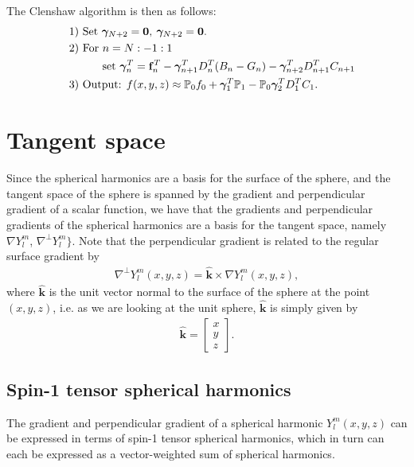 \documentclass[11pt, oneside]{article}   	%
\newcommand{\Ylm}{Y^m_l}
\newcommand{\bigP}{\mathbb{P}}
\newcommand{\gradYlm}{\nabla Y^m_l}
\newcommand{\gradpYlm}{\nabla^\perp Y^m_l}
\newcommand{\unitvec}{\hat{\bm{k}}}
\begin{document}
The Clenshaw algorithm is then as follows:
\begin{align*}
\quad &\text{1) } \text{Set } \bm{\gamma}_{N+2} = \bold{0}, \: \bm{\gamma}_{N+2} = \bold{0}. \\
\quad &\text{2) } \text{For } n = N:-1:1 \\
\quad & \quad \quad \quad \text{set } \bm{\gamma}_{n}^T = \bold{f}_n^T - \bm{\gamma}_{n+1}^T D^T_n (B_n - G_n) -  \bm{\gamma}_{n+2}^T D^T_{n+1}C_{n+1} \\
\quad &\text{3) } \text{Output: } f(x,y,z) \approx \bigP_0 f_0 + \bm{\gamma}_{1}^T \bigP_1 - \bigP_0 \bm{\gamma}_{2}^T D^T_1 C_1.
\end{align*}






\section{Tangent space}

Since the spherical harmonics are a basis for the surface of the sphere, and the tangent space of the sphere is spanned by the gradient  and perpendicular gradient of a scalar function, we have that the gradients and perpendicular gradients of the spherical harmonics are a basis for the tangent space, namely \(\gradYlm\), \(\gradpYlm\}\). Note that the perpendicular gradient is related to the regular surface gradient by
\begin{align}
\gradpYlm(x,y,z) = \unitvec \times \gradYlm(x,y,z),
\end{align}
where \(\unitvec\) is the unit vector normal to the surface of the sphere at the point \((x,y,z)\), i.e. as we are looking at the unit sphere, \(\unitvec\) is simply given by
\begin{align}
\unitvec = \begin{bmatrix} x \\ y \\ z \end{bmatrix}.
\end{align}



\subsection{Spin-1 tensor spherical harmonics}

The gradient and perpendicular gradient of a spherical harmonic \(\Ylm(x,y,z)\) can be expressed in terms of spin-1 tensor spherical harmonics, which in turn can each be expressed as a vector-weighted sum of spherical harmonics.
\end{document}

